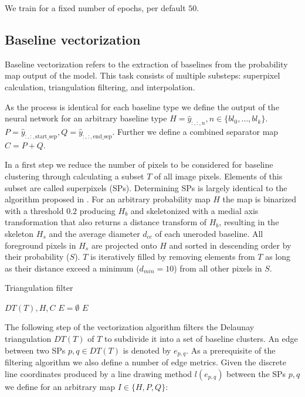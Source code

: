 We train for a fixed number of epochs, per default $50$.

\subsection{Baseline vectorization }

Baseline vectorization refers to the extraction of baselines from the
probability map output of the model. This task consists of multiple substeps:
superpixel calculation, triangulation filtering, and interpolation.

As the process is identical for each baseline type we define the output of the
neural network for an arbitrary baseline type $H = \hat{y}_{:,:,n}, n \in
\{bl_0, \dots, bl_k\}$. $P = \hat{y}_{:,:,\text{start\_sep}}, Q =
\hat{y}_{:,:,\text{end\_sep}}$.  Further we define a combined separator map $C = P + Q$.

In a first step we reduce the number of pixels to be considered for baseline
clustering through calculating a subset $T$ of all image pixels. Elements of
this subset are called superpixels (SPs). Determining SPs is largely identical
to the algorithm proposed in \cite{gruning2019two}. For an arbitrary
probability map $H$ the map is binarized with a threshold $0.2$ producing $H_b$
and skeletonized with a medial axis transformation that also returns a distance
transform of $H_b$, resulting in the skeleton $H_s$ and the  average
diameter $d_{cc}$ of each uneroded baseline. All foreground pixels in $H_s$ are
projected onto $H$ and sorted in descending order by their probability ($S$).
$T$ is iteratively filled by removing elements from $T$ as long as their
distance exceed a minimum ($d_{min} = 10$) from all other pixels in $S$.

\begin{algorithm}[H]
\caption{Triangulation filter}
\label{alg:dt_filter}
\begin{algorithmic}[1]
	\renewcommand{\algorithmicrequire}{\textbf{Input:}}
	\REQUIRE $DT(T), H, C$ 
	\STATE $E = \emptyset$
			\ENDIF
		\ENDIF 
	\ENDFOR
	\RETURN $E$
\end{algorithmic}
\end{algorithm}

The following step of the vectorization algorithm filters the Delaunay
triangulation $DT(T)$ of $T$ to subdivide it into a set of baseline clusters.
An edge between two SPs $p, q \in DT(T)$ is denoted by $e_{p, q}$. As a
prerequisite of the filtering algorithm we also define a number of edge
metrics. Given the discrete line coordinates produced by a line drawing method
$l(e_{p, q})$ between the SPs $p, q$ we define for an arbitrary map $I \in \{H,
P, Q\}$:

